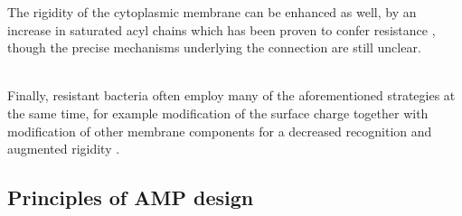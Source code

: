 The rigidity of the cytoplasmic membrane can be enhanced as well, by an increase in saturated acyl chains which has been proven to confer resistance \cite{Band2014,Kumariya2015}, though the precise mechanisms underlying the connection are still unclear.

\hspace{0.5cm}
\\
Finally, resistant bacteria often employ many of the aforementioned strategies at the same time, for example modification of the surface charge together with modification of other membrane components for a decreased recognition and augmented rigidity \cite{Raetz2007}.


\subsection{Principles of AMP design} \label{sec:amp_design}

